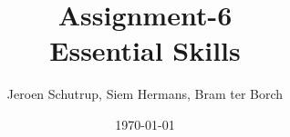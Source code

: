 \documentclass[twoside,a4paper]{article}
\title{Assignment-6 \\ Essential Skills}
\author{Jeroen Schutrup, Siem Hermans, Bram ter Borch}
\date{\today}
\begin{document}
\pagestyle{empty}							%
\maketitle
\cleardoublepage{}							%
\tableofcontents
\cleardoublepage{}
\pagestyle{fancy}							%
\cleardoublepage{}

\cleardoublepage{}

\printbibliography{}							%
\newpage
\begin{appendices}							%
	
	\newpage
\end{appendices}
\end{document}
